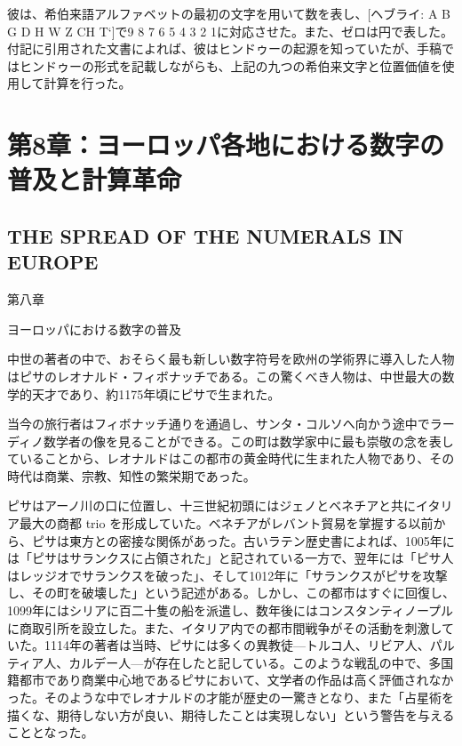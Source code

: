 \documentclass[a4paper,11pt,openany]{ltjsbook}
\begin{document}
彼は、希伯来語アルファベットの最初の文字を用いて数を表し、[ヘブライ: A B G D H W Z CH T`]で9 8 7 6 5 4 3 2 1に対応させた。また、ゼロは円で表した。付記に引用された文書によれば、彼はヒンドゥーの起源を知っていたが、手稿ではヒンドゥーの形式を記載しながらも、上記の九つの希伯来文字と位置価値を使用して計算を行った。

\clearpage

\chapter{第8章：ヨーロッパ各地における数字の普及と計算革命}
\section*{THE SPREAD OF THE NUMERALS IN EUROPE}

第八章

ヨーロッパにおける数字の普及

中世の著者の中で、おそらく最も新しい数字符号を欧州の学術界に導入した人物はピサのレオナルド・フィボナッチである。この驚くべき人物は、中世最大の数学的天才であり、約1175年頃にピサで生まれた。

当今の旅行者はフィボナッチ通りを通過し、サンタ・コルソへ向かう途中でラーディノ数学者の像を見ることができる。この町は数学家中に最も崇敬の念を表していることから、レオナルドはこの都市の黄金時代に生まれた人物であり、その時代は商業、宗教、知性の繁栄期であった。

ピサはアーノ川の口に位置し、十三世紀初頭にはジェノとベネチアと共にイタリア最大の商都 trio を形成していた。ベネチアがレバント貿易を掌握する以前から、ピサは東方との密接な関係があった。古いラテン歴史書によれば、1005年には「ピサはサランクスに占領された」と記されている一方で、翌年には「ピサ人はレッジオでサランクスを破った」、そして1012年に「サランクスがピサを攻撃し、その町を破壊した」という記述がある。しかし、この都市はすぐに回復し、1099年にはシリアに百二十隻の船を派遣し、数年後にはコンスタンティノープルに商取引所を設立した。また、イタリア内での都市間戦争がその活動を刺激していた。1114年の著者は当時、ピサには多くの異教徒—トルコ人、リビア人、パルティア人、カルデー人—が存在したと記している。このような戦乱の中で、多国籍都市であり商業中心地であるピサにおいて、文学者の作品は高く評価されなかった。そのような中でレオナルドの才能が歴史の一驚きとなり、また「占星術を描くな、期待しない方が良い、期待したことは実現しない」という警告を与えることとなった。
\end{document}
